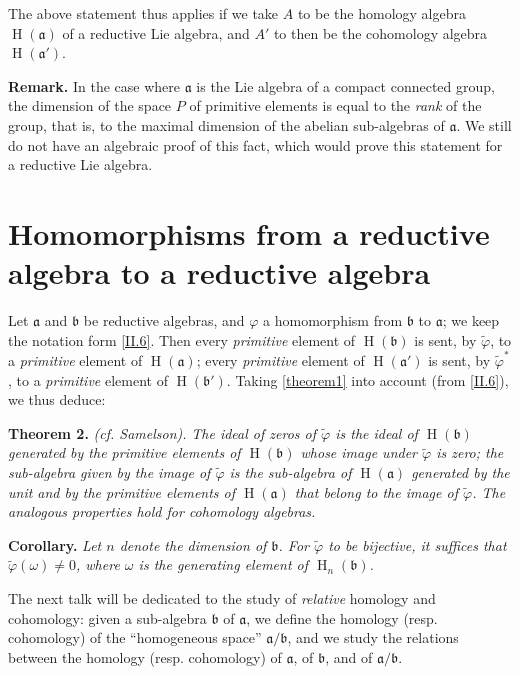 \documentclass{article}
\newcommand{\fk}{\mathfrak}
\DeclareMathOperator{\HH}{H}
\newcommand{\oldpage}[1]{\marginpar{\footnotesize$\Big\vert$ \textit{p.~#1}}}
\begin{document}
The above statement thus applies if we take $A$ to be the homology algebra $\HH(\fk{a})$ of a reductive Lie algebra, and $A'$ to then be the cohomology algebra $\HH(\fk{a}')$.

\medskip
\textbf{Remark.}
In the case where $\fk{a}$ is the Lie algebra of a compact connected group, the dimension of the space $P$ of primitive elements is equal to the \emph{rank} of the group, that is, to the maximal dimension of the abelian sub-algebras of $\fk{a}$.
We still do not have an algebraic proof of this fact, which would prove this statement for a reductive Lie algebra.


\section{Homomorphisms from a reductive algebra to a reductive algebra}
\label{II.8}

Let $\fk{a}$ and $\fk{b}$ be reductive algebras, and $\varphi$ a homomorphism from $\fk{b}$ to $\fk{a}$;
we keep the notation form \cref{II.6}.
Then every \emph{primitive} element of $\HH(\fk{b})$ is sent, by $\widetilde{\varphi}$, to a \emph{primitive} element of $\HH(\fk{a})$;
every \emph{primitive} element of $\HH(\fk{a}')$ is sent, by $\widetilde{\varphi}^*$, to a \emph{primitive} element of $\HH(\fk{b}')$.
Taking
\oldpage{52}
\cref{theorem1} into account (from \cref{II.6}), we thus deduce:

\medskip
\textbf{Theorem 2.}
\emph{(cf. Samelson).}
{\itshape
  The ideal of zeros of $\widetilde{\varphi}$ is the \emph{ideal} of $\HH(\fk{b})$ generated by the \emph{primitive} elements of $\HH(\fk{b})$ whose image under $\widetilde{\varphi}$ is zero;
  the sub-algebra given by the image of $\widetilde{\varphi}$ is the \emph{sub-algebra} of $\HH(\fk{a})$ generated by the unit and by the \emph{primitive} elements of $\HH(\fk{a})$ that belong to the image of $\widetilde{\varphi}$.
  The analogous properties hold for cohomology algebras.
}

\medskip
\textbf{Corollary.}
{\itshape
  Let $n$ denote the dimension of $\fk{b}$.
  For $\widetilde{\varphi}$ to be \emph{bijective}, it suffices that $\widetilde{\varphi}(\omega)\neq0$, where $\omega$ is the generating element of $\HH_n(\fk{b})$.
}

\medskip
The next talk will be dedicated to the study of \emph{relative} homology and cohomology:
given a sub-algebra $\fk{b}$ of $\fk{a}$, we define the homology (resp. cohomology) of the ``homogeneous space'' $\fk{a}/\fk{b}$, and we study the relations between the homology (resp. cohomology) of $\fk{a}$, of $\fk{b}$, and of $\fk{a}/\fk{b}$.
\end{document}
